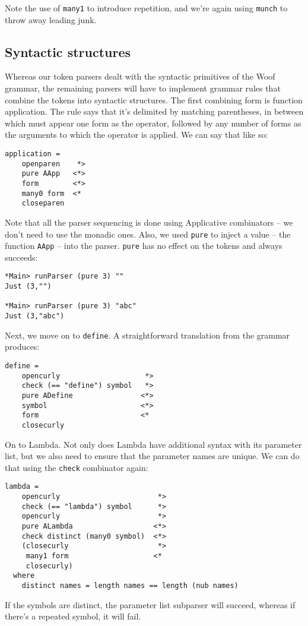 \documentclass{tmr}
\begin{document}
Note the use of \verb+many1+ to introduce repetition,
and we're again using \verb+munch+ to throw away leading junk.

\subsection{Syntactic structures}
Whereas our token parsers dealt with the syntactic primitives of the Woof grammar, 
the remaining parsers will have to implement grammar rules that combine the tokens
into syntactic structures.
The first combining form is function application.  The rule says that it's delimited
by matching parentheses, in between which must appear one form as the operator, followed
by any number of forms as the arguments to which the operator is applied.  We can
say that like so:
\begin{verbatim}
application =
    openparen    *>
    pure AApp   <*>
    form        <*>
    many0 form  <*
    closeparen
\end{verbatim}

Note that all the parser sequencing is done using Applicative
combinators -- we don't need to use the monadic ones.  Also, we used \verb+pure+ 
to inject a value -- the function \verb+AApp+ -- into the parser.  \verb+pure+ 
has no effect on the tokens and always succeeds:
\begin{verbatim}
*Main> runParser (pure 3) ""
Just (3,"")

*Main> runParser (pure 3) "abc"
Just (3,"abc")
\end{verbatim}

Next, we move on to \verb+define+.
A straightforward translation from the grammar produces:
\begin{verbatim}
define =
    opencurly                    *>
    check (== "define") symbol   *>
    pure ADefine                <*>
    symbol                      <*>
    form                        <*
    closecurly
\end{verbatim}

On to Lambda.  Not only does Lambda have additional syntax with its parameter 
list, but we also need to ensure that the parameter names are unique.  We can 
do that using the \verb+check+ combinator again:
\begin{verbatim}
lambda = 
    opencurly                       *>
    check (== "lambda") symbol      *>
    opencurly                       *>
    pure ALambda                   <*>
    check distinct (many0 symbol)  <*>
    (closecurly                     *>
     many1 form                    <*
     closecurly)
  where
    distinct names = length names == length (nub names)
\end{verbatim}
If the symbols are distinct, the parameter list subparser will succeed,
whereas if there's a repeated symbol, it will fail.
\end{document}
